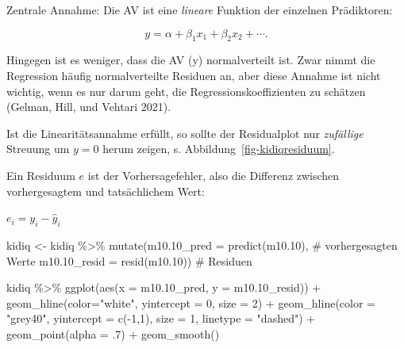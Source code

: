 \documentclass[
  a4paper,
  DIV=11]{scrreprt}
\newenvironment{Shaded}{\begin{snugshade}}{\end{snugshade}}
\newcommand{\AttributeTok}[1]{\textcolor[rgb]{0.40,0.45,0.13}{#1}}
\newcommand{\CommentTok}[1]{\textcolor[rgb]{0.37,0.37,0.37}{#1}}
\newcommand{\DecValTok}[1]{\textcolor[rgb]{0.68,0.00,0.00}{#1}}
\newcommand{\FloatTok}[1]{\textcolor[rgb]{0.68,0.00,0.00}{#1}}
\newcommand{\FunctionTok}[1]{\textcolor[rgb]{0.28,0.35,0.67}{#1}}
\newcommand{\NormalTok}[1]{\textcolor[rgb]{0.00,0.23,0.31}{#1}}
\newcommand{\OtherTok}[1]{\textcolor[rgb]{0.00,0.23,0.31}{#1}}
\newcommand{\SpecialCharTok}[1]{\textcolor[rgb]{0.37,0.37,0.37}{#1}}
\newcommand{\StringTok}[1]{\textcolor[rgb]{0.13,0.47,0.30}{#1}}
\theoremstyle{definition}
\theoremstyle{remark}
\begin{document}
Zentrale Annahme: Die AV ist eine \emph{lineare} Funktion der einzelnen
Prädiktoren:

\[y= \alpha + \beta_1x_1 + \beta_2 x_2 + \cdots .\]

Hingegen ist es weniger, dass die AV (y) normalverteilt ist. Zwar nimmt
die Regression häufig normalverteilte Residuen an, aber diese Annahme
ist nicht wichtig, wenn es nur darum geht, die Regressionskoeffizienten
zu schätzen (Gelman, Hill, und Vehtari 2021).

Ist die Linearitätsannahme erfüllt, so sollte der Residualplot nur
\emph{zufällige} Streuung um \(y=0\) herum zeigen, s.
Abbildung~\ref{fig-kidiqresiduum}.

Ein Residuum \(e\) ist der Vorhersagefehler, also die Differenz zwischen
vorhergesagtem und tatsächlichem Wert:

\(e_i = y_i - \hat{y}_i\)

\begin{Shaded}
\begin{Highlighting}[]
\NormalTok{kidiq }\OtherTok{\textless{}{-}}
\NormalTok{  kidiq }\SpecialCharTok{\%\textgreater{}\%} 
  \FunctionTok{mutate}\NormalTok{(}\AttributeTok{m10.10\_pred =} \FunctionTok{predict}\NormalTok{(m10}\FloatTok{.10}\NormalTok{),  }\CommentTok{\# vorhergesagten Werte}
         \AttributeTok{m10.10\_resid =} \FunctionTok{resid}\NormalTok{(m10}\FloatTok{.10}\NormalTok{))  }\CommentTok{\# Residuen}
\end{Highlighting}
\end{Shaded}

\begin{Shaded}
\begin{Highlighting}[]
\NormalTok{kidiq }\SpecialCharTok{\%\textgreater{}\%} 
  \FunctionTok{ggplot}\NormalTok{(}\FunctionTok{aes}\NormalTok{(}\AttributeTok{x =}\NormalTok{ m10}\FloatTok{.10}\NormalTok{\_pred, }\AttributeTok{y =}\NormalTok{ m10}\FloatTok{.10}\NormalTok{\_resid)) }\SpecialCharTok{+}
  \FunctionTok{geom\_hline}\NormalTok{(}\AttributeTok{color=}\StringTok{"white"}\NormalTok{, }\AttributeTok{yintercept =} \DecValTok{0}\NormalTok{, }\AttributeTok{size =} \DecValTok{2}\NormalTok{) }\SpecialCharTok{+}
  \FunctionTok{geom\_hline}\NormalTok{(}\AttributeTok{color =} \StringTok{"grey40"}\NormalTok{, }
             \AttributeTok{yintercept =} \FunctionTok{c}\NormalTok{(}\SpecialCharTok{{-}}\DecValTok{1}\NormalTok{,}\DecValTok{1}\NormalTok{), }
             \AttributeTok{size =} \DecValTok{1}\NormalTok{, }
             \AttributeTok{linetype =} \StringTok{"dashed"}\NormalTok{) }\SpecialCharTok{+}
  \FunctionTok{geom\_point}\NormalTok{(}\AttributeTok{alpha =}\NormalTok{ .}\DecValTok{7}\NormalTok{) }\SpecialCharTok{+}
  \FunctionTok{geom\_smooth}\NormalTok{()}
\end{Highlighting}
\end{Shaded}
\end{document}
